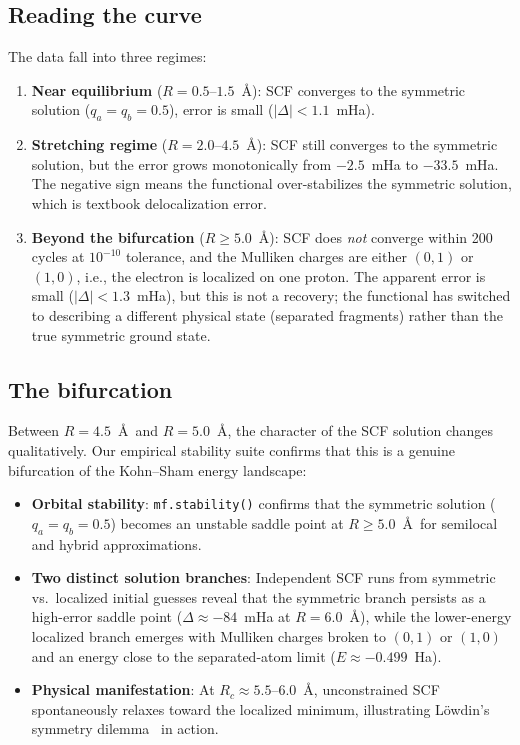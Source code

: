 \documentclass[11pt]{report}
\theoremstyle{definition}
\theoremstyle{remark}
\begin{document}
\subsection{Reading the curve}

The data fall into three regimes:

\begin{enumerate}
  \item \textbf{Near equilibrium} ($R = 0.5$--$1.5$~\AA): SCF converges to
        the symmetric solution ($q_a = q_b = 0.5$), error is small
        ($|\Delta| < 1.1$~mHa).
  \item \textbf{Stretching regime} ($R = 2.0$--$4.5$~\AA): SCF still
        converges to the symmetric solution, but the error grows
        monotonically from $-2.5$~mHa to $-33.5$~mHa. The negative sign
        means the functional over-stabilizes the symmetric solution, which
        is textbook delocalization error.
  \item \textbf{Beyond the bifurcation} ($R \ge 5.0$~\AA): SCF does
        \emph{not} converge within 200 cycles at $10^{-10}$ tolerance, and
        the Mulliken charges are either $(0,1)$ or $(1,0)$, i.e., the
        electron is localized on one proton. The apparent error is small
        ($|\Delta| < 1.3$~mHa), but this is not a recovery; the functional
        has switched to describing a different physical state (separated
        fragments) rather than the true symmetric ground state.
\end{enumerate}

\subsection{The bifurcation}

Between $R = 4.5$~\AA\ and $R = 5.0$~\AA, the character of the SCF
solution changes qualitatively. Our empirical stability suite confirms
that this is a genuine bifurcation of the Kohn--Sham energy landscape:
\begin{itemize}
  \item \textbf{Orbital stability}: \texttt{mf.stability()} confirms that the
        symmetric solution ($q_a = q_b = 0.5$) becomes an unstable saddle point
        at $R \ge 5.0$~\AA\ for semilocal and hybrid approximations.
  \item \textbf{Two distinct solution branches}: Independent SCF runs from
        symmetric vs.\ localized initial guesses reveal that the symmetric branch
        persists as a high-error saddle point ($\Delta \approx -84$~mHa at $R = 6.0$~\AA),
        while the lower-energy localized branch emerges with Mulliken charges
        broken to $(0, 1)$ or $(1, 0)$ and an energy close to the separated-atom
        limit ($E \approx -0.499$~Ha).
  \item \textbf{Physical manifestation}: At $R_c \approx 5.5\text{--}6.0$~\AA,
        unconstrained SCF spontaneously relaxes toward the localized minimum,
        illustrating L\"owdin's symmetry dilemma~\cite{Lowdin1963} in action.
\end{itemize}
\end{document}
